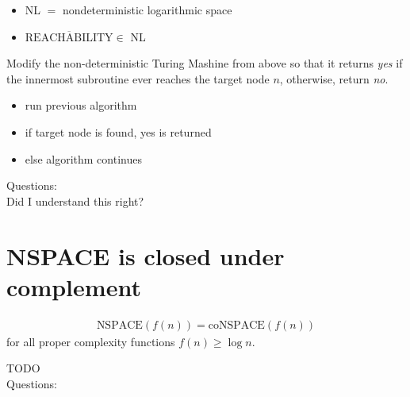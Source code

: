 \documentclass[a4]{scrartcl}
\begin{document}
\begin{itemize}
\item NL $=$ nondeterministic logarithmic space
\item $\overline{\text{REACHABILITY}} \in$ NL
\end{itemize}


Modify the non-deterministic Turing Mashine from above so that it returns \textit{yes} if the innermost subroutine ever reaches the target node $n$, otherwise, return \textit{no}.

\begin{itemize}
\item run previous algorithm
\item if target node is found, yes is returned
\item else algorithm continues
\end{itemize}

\color{violet} Questions: \\
Did I understand this right?
\color{black}



\section*{NSPACE is closed under complement}

\begin{align*}
\text{NSPACE}(f(n)) = \text{coNSPACE}(f(n))
\end{align*}
for all proper complexity functions $f(n) \geq \log n$.


\color{red} TODO \\
\color{black}
\color{violet} Questions:
\color{black}




\newpage

\printbibliography
\end{document}
